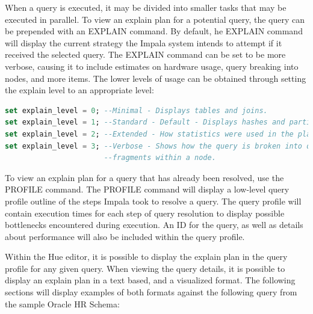 \documentclass[onecolumn, draftclsnofoot,10pt, compsoc]{IEEEtran}
\begin{document}
When a query is executed, it may be divided into smaller tasks that may be executed in parallel.  
To view an explain plan for a potential query, the query can be prepended with an EXPLAIN command. By default, he EXPLAIN command will display the current strategy the Impala system intends to attempt if it received the selected query. The EXPLAIN command can be set to be more verbose, causing it to include estimates on hardware usage, query breaking into nodes, and more items. The lower levels of usage can be obtained through setting the explain level to an appropriate level:
    \begin{center}
    \begin{lstlisting}[language=SQL]
set explain_level = 0; --Minimal - Displays tables and joins.
set explain_level = 1; --Standard - Default - Displays hashes and partitions.
set explain_level = 2; --Extended - How statistics were used in the planning.
set explain_level = 3; --Verbose - Shows how the query is broken into query 
                       --fragments within a node.
\end{lstlisting}
\end{center}
To view an explain plan for a query that has already been resolved, use the PROFILE command. The PROFILE command will display a low-level query profile outline of the steps Impala took to resolve a query. The query profile will contain execution times for each step of query resolution to display possible bottlenecks encountered during execution. An ID for the query, as well as details about performance will also be included within the query profile.  

Within the Hue editor, it is possible to display the explain plan in the query profile for any given query. When viewing the query details, it is possible to display an explain plan in a text based, and a visualized format. The following sections will display examples of both formats against the following query from the sample Oracle HR Schema:
\end{document}
